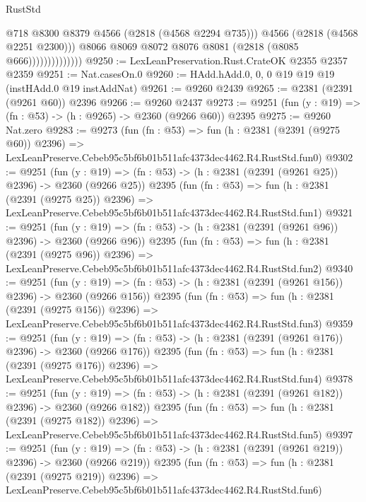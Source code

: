 \begin{lexlean}{RustStd}
\begin{coremodule}
                                @718
                                @8300
                                @8379
                                @4566
                                (@2818 (@4568 @2294 @735)))
                              @4566
                              (@2818 (@4568 @2251 @2300)))
                            @8066
                            @8069
                            @8072
                            @8076
                            @8081
                            (@2818 (@8085 @666))))))))))))))
@9250 := LexLeanPreservation.Rust.CrateOK @2355 @2357 @2359
@9251 := Nat.casesOn.{0}
@9260 := HAdd.hAdd.{0, 0, 0} @19 @19 @19 (instHAdd.{0} @19 instAddNat)
@9261 := @9260 @2439
@9265 := @2381 (@2391 (@9261 @60)) @2396
@9266 := @9260 @2437
@9273 := @9251 (fun (y : @19) => (fn : @53) -> (h : @9265) -> @2360 (@9266 @60)) @2395
@9275 := @9260 Nat.zero
@9283 := @9273
    (fun (fn : @53) =>
    fun (h : @2381 (@2391 (@9275 @60)) @2396) =>
    LexLeanPreserve.Cebeb95c5bf6b01b511afc4373dec4462.R4.RustStd.fun0)
@9302 := @9251
    (fun (y : @19) => (fn : @53) -> (h : @2381 (@2391 (@9261 @25)) @2396) -> @2360 (@9266 @25))
    @2395
    (fun (fn : @53) =>
    fun (h : @2381 (@2391 (@9275 @25)) @2396) =>
    LexLeanPreserve.Cebeb95c5bf6b01b511afc4373dec4462.R4.RustStd.fun1)
@9321 := @9251
    (fun (y : @19) => (fn : @53) -> (h : @2381 (@2391 (@9261 @96)) @2396) -> @2360 (@9266 @96))
    @2395
    (fun (fn : @53) =>
    fun (h : @2381 (@2391 (@9275 @96)) @2396) =>
    LexLeanPreserve.Cebeb95c5bf6b01b511afc4373dec4462.R4.RustStd.fun2)
@9340 := @9251
    (fun (y : @19) => (fn : @53) -> (h : @2381 (@2391 (@9261 @156)) @2396) -> @2360 (@9266 @156))
    @2395
    (fun (fn : @53) =>
    fun (h : @2381 (@2391 (@9275 @156)) @2396) =>
    LexLeanPreserve.Cebeb95c5bf6b01b511afc4373dec4462.R4.RustStd.fun3)
@9359 := @9251
    (fun (y : @19) => (fn : @53) -> (h : @2381 (@2391 (@9261 @176)) @2396) -> @2360 (@9266 @176))
    @2395
    (fun (fn : @53) =>
    fun (h : @2381 (@2391 (@9275 @176)) @2396) =>
    LexLeanPreserve.Cebeb95c5bf6b01b511afc4373dec4462.R4.RustStd.fun4)
@9378 := @9251
    (fun (y : @19) => (fn : @53) -> (h : @2381 (@2391 (@9261 @182)) @2396) -> @2360 (@9266 @182))
    @2395
    (fun (fn : @53) =>
    fun (h : @2381 (@2391 (@9275 @182)) @2396) =>
    LexLeanPreserve.Cebeb95c5bf6b01b511afc4373dec4462.R4.RustStd.fun5)
@9397 := @9251
    (fun (y : @19) => (fn : @53) -> (h : @2381 (@2391 (@9261 @219)) @2396) -> @2360 (@9266 @219))
    @2395
    (fun (fn : @53) =>
    fun (h : @2381 (@2391 (@9275 @219)) @2396) =>
    LexLeanPreserve.Cebeb95c5bf6b01b511afc4373dec4462.R4.RustStd.fun6)

\end{coremodule}
\end{lexlean}
